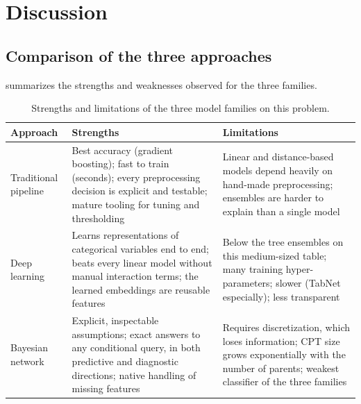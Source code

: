 \section{Discussion}
\label{sec:discussion}

\subsection{Comparison of the three approaches}
 summarizes the strengths and weaknesses observed for the three families.

\begin{table}[H]
  \centering
  \small
  \begin{tabularx}{\linewidth}{l>{\raggedright\arraybackslash}X>{\raggedright\arraybackslash}X}
    \toprule
    \textbf{Approach} & \textbf{Strengths} & \textbf{Limitations} \\
    \midrule
    Traditional pipeline &
    Best accuracy (gradient boosting); fast to train (seconds); every preprocessing decision is explicit and testable; mature tooling for tuning and thresholding &
    Linear and distance-based models depend heavily on hand-made preprocessing; ensembles are harder to explain than a single model \\
    Deep learning &
    Learns representations of categorical variables end to end; beats every linear model without manual interaction terms; the learned embeddings are reusable features &
    Below the tree ensembles on this medium-sized table; many training hyper-parameters; slower (TabNet especially); less transparent \\
    Bayesian network &
    Explicit, inspectable assumptions; exact answers to any conditional query, in both predictive and diagnostic directions; native handling of missing features &
    Requires discretization, which loses information; CPT size grows exponentially with the number of parents; weakest classifier of the three families \\
    \bottomrule
  \end{tabularx}
  \caption{Strengths and limitations of the three model families on this problem.}
  \label{tab:approaches}
\end{table}

